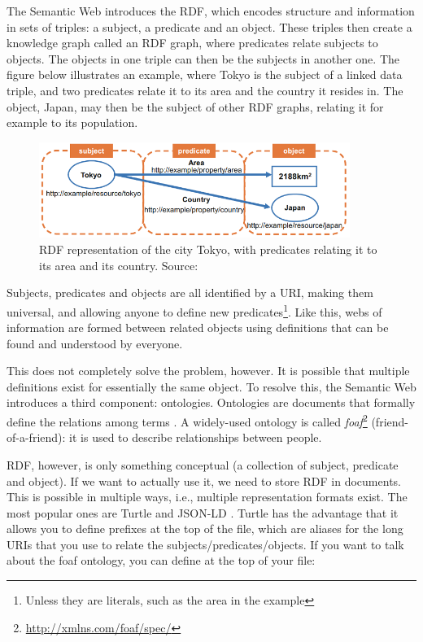 \noindent The Semantic Web introduces the \gls{RDF}, which encodes structure and information in sets of triples: a subject, a predicate and an object. These triples  then create a knowledge graph called an RDF graph, where predicates relate subjects to objects. The objects in one triple can then be the subjects in another one. The figure below illustrates an example, where Tokyo is the subject of a linked data triple, and two predicates relate it to its area and the country it resides in. The object, Japan, may then be the subject of other RDF graphs, relating it for example to its population.

\begin{figure}[H]
    \centering
    \includegraphics[width = 0.9\textwidth]{images/background/linked-data.png}
    \caption{\gls{RDF} representation of the city Tokyo, with predicates relating it to its area and its country. Source: \citet{generating-pva}}
    \label{fig:linked-data}
\end{figure}

\noindent Subjects, predicates and objects are all identified by a URI, making them universal, and allowing anyone to define new predicates\footnote{Unless they are literals, such as the area in the example}. Like this, webs of information are formed between related objects using definitions that can be found and understood by everyone.

This does not completely solve the problem, however. It is possible that multiple definitions exist for essentially the same object. To resolve this, the Semantic Web introduces a third component: ontologies. Ontologies are documents that formally define the relations among terms \citep{semantic-web}. A widely-used ontology is called \textit{foaf}\footnote{\url{ http://xmlns.com/foaf/spec/}} (friend-of-a-friend): it is used to describe relationships between people.

\gls{RDF}, however, is only something conceptual (a collection of subject, predicate and object). If we want to actually use it, we need to store \gls{RDF} in documents. This is possible in multiple ways, i.e., multiple representation formats exist. The most popular ones are Turtle \citep{turtle} and JSON-LD \citep{jsonld}. Turtle has the advantage that it allows you to define prefixes at the top of the file, which are aliases for the long URIs that you use to relate the subjects/predicates/objects. If you want to talk about the foaf ontology, you can define at the top of your file:

